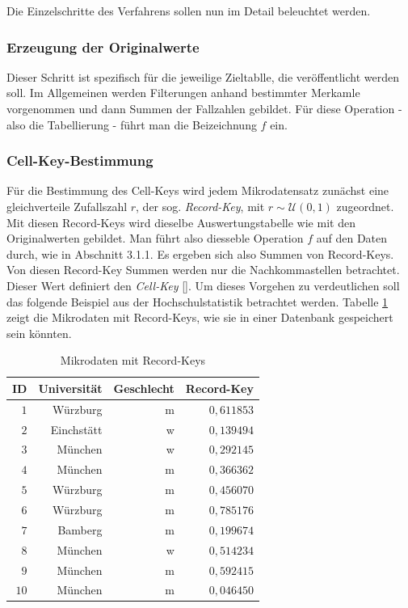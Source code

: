 Die Einzelschritte des Verfahrens sollen nun im Detail beleuchtet werden.

\subsubsection{Erzeugung der Originalwerte}

Dieser Schritt ist spezifisch für die jeweilige Zieltablle, die veröffentlicht werden soll. Im Allgemeinen werden Filterungen anhand bestimmter Merkamle vorgenommen und dann Summen der Fallzahlen gebildet. Für diese Operation - also die Tabellierung - führt man die Beizeichnung $f$ ein.

\subsubsection{Cell-Key-Bestimmung}

Für die Bestimmung des Cell-Keys wird jedem Mikrodatensatz zunächst eine gleichverteile Zufallszahl $r$, der sog. \textit{Record-Key}, mit $r \sim \mathcal{U}(0, 1)$ zugeordnet. Mit diesen Record-Keys wird dieselbe Auswertungstabelle wie mit den Originalwerten gebildet. Man führt also diesseble  Operation $f$ auf den Daten durch, wie in Abschnitt 3.1.1. Es ergeben sich also Summen von Record-Keys. Von diesen Record-Key Summen werden nur die Nachkommastellen betrachtet. Dieser Wert definiert den \textit{Cell-Key} [\cite{Enderle}]. Um dieses Vorgehen zu verdeutlichen soll das folgende Beispiel aus der Hochschulstatistik betrachtet werden. Tabelle \ref{tab_mikrodaten} zeigt die Mikrodaten mit Record-Keys, wie sie in einer Datenbank gespeichert sein könnten.

\begin{table}[h]
    \centering
    \begin{tabular}{ r r r r }
        \textbf{ID} \vline & \textbf{Universität} & \textbf{Geschlecht} & \textbf{Record-Key} \\ 
        \hline
        $1$ \vline & Würzburg & m & $0,611853$ \\
        $2$ \vline & Einchstätt & w & $0,139494$ \\
        $3$ \vline & München & w & $0,292145$ \\
        $4$ \vline & München & m & $0,366362$ \\
        $5$ \vline & Würzburg & m & $0,456070$ \\
        $6$ \vline & Würzburg & m & $0,785176$ \\
        $7$ \vline & Bamberg & m & $0,199674$ \\
        $8$ \vline & München & w & $0,514234$ \\
        $9$ \vline & München & m & $0,592415$ \\
        $10$ \vline & München & m & $0,046450$
    \end{tabular}
    \caption{Mikrodaten mit Record-Keys}
    \label{tab_mikrodaten}
\end{table}

